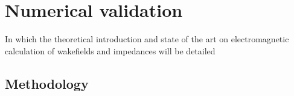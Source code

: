 %
\chapter{Numerical validation}
\label{ch::chapter5}

\begin{center}
  \begin{minipage}{0.5\textwidth}
    \begin{small}
      In which the theoretical introduction and state of the art on electromagnetic calculation of wakefields and impedances will be detailed
    \end{small}
  \end{minipage}
  \vspace{0.5cm}
\end{center}

\section{Methodology}


